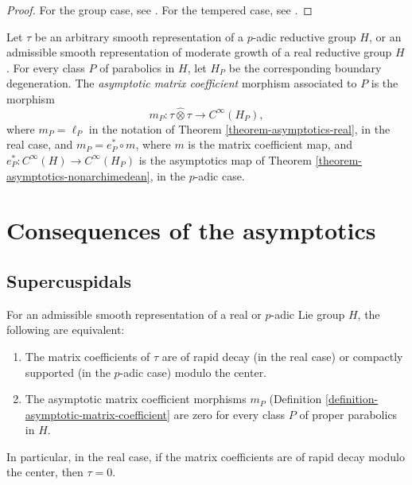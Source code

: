 \begin{proof}
 For the group case, see \cite[4.4]{Wallach-RR1}. For the tempered case, see \cite{Delorme-Kroetz-Souaifi}.
\end{proof}

\begin{definition}
 \label{definition-asymptotic-matrix-coefficient}
Let $\tau$ be an arbitrary smooth representation of a $p$-adic reductive group $H$, or an admissible smooth representation of moderate growth of a real reductive group $H$. For every class $P$ of parabolics in $H$, let $H_P$ be the corresponding boundary degeneration. The {\it asymptotic matrix coefficient} morphism associated to $P$ is the morphism 
$$m_P: \tau\hat\otimes\tau \to C^\infty(H_P),$$
where $m_P = \ell_P$ in the notation of Theorem \ref{theorem-asymptotics-real}, in the real case, and $m_P = e_P^*\circ m$, where $m$ is the matrix coefficient map, and $e_P^*: C^\infty(H)\to C^\infty(H_P)$ is the asymptotics map of Theorem \ref{theorem-asymptotics-nonarchimedean}, in the $p$-adic case.
\end{definition}



\section{Consequences of the asymptotics}
\label{section-consequences-asymptotics}

\subsection{Supercuspidals}
\label{subsection-supercuspidals}


\begin{proposition}
 \label{proposition-compact-matrix-coefficients}
For an admissible smooth representation of a real or $p$-adic Lie group $H$, the following are equivalent:
\begin{enumerate}
 \item The matrix coefficients of $\tau$ are of rapid decay (in the real case) or compactly supported (in the $p$-adic case) modulo the center.
 \item The asymptotic matrix coefficient morphisms $m_P$ (Definition \ref{definition-asymptotic-matrix-coefficient} are zero for every class $P$ of proper parabolics in $H$. 
\end{enumerate}

 In particular, in the real case, if the matrix coefficients are of rapid decay modulo the center, then $\tau=0$.
\end{proposition}

